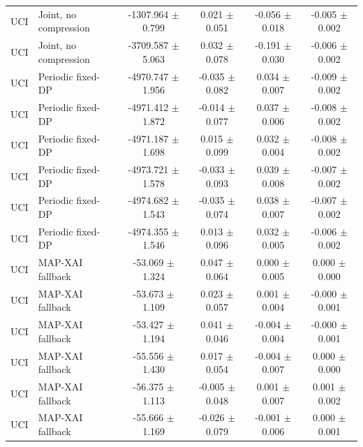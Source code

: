 \begin{tabular}{llcccc}
UCI & Joint, no compression & -1307.964 $\pm$ 0.799 & 0.021 $\pm$ 0.051 & -0.056 $\pm$ 0.018 & -0.005 $\pm$ 0.002 \\
UCI & Joint, no compression & -3709.587 $\pm$ 5.063 & 0.032 $\pm$ 0.078 & -0.191 $\pm$ 0.030 & -0.006 $\pm$ 0.002 \\
UCI & Periodic fixed-DP & -4970.747 $\pm$ 1.956 & -0.035 $\pm$ 0.082 & 0.034 $\pm$ 0.007 & -0.009 $\pm$ 0.002 \\
UCI & Periodic fixed-DP & -4971.412 $\pm$ 1.872 & -0.014 $\pm$ 0.077 & 0.037 $\pm$ 0.006 & -0.008 $\pm$ 0.002 \\
UCI & Periodic fixed-DP & -4971.187 $\pm$ 1.698 & 0.015 $\pm$ 0.099 & 0.032 $\pm$ 0.004 & -0.008 $\pm$ 0.002 \\
UCI & Periodic fixed-DP & -4973.721 $\pm$ 1.578 & -0.033 $\pm$ 0.093 & 0.039 $\pm$ 0.008 & -0.007 $\pm$ 0.002 \\
UCI & Periodic fixed-DP & -4974.682 $\pm$ 1.543 & -0.035 $\pm$ 0.074 & 0.038 $\pm$ 0.007 & -0.007 $\pm$ 0.002 \\
UCI & Periodic fixed-DP & -4974.355 $\pm$ 1.546 & 0.013 $\pm$ 0.096 & 0.032 $\pm$ 0.005 & -0.006 $\pm$ 0.002 \\
UCI & MAP-XAI fallback & -53.069 $\pm$ 1.324 & 0.047 $\pm$ 0.064 & 0.000 $\pm$ 0.005 & 0.000 $\pm$ 0.000 \\
UCI & MAP-XAI fallback & -53.673 $\pm$ 1.109 & 0.023 $\pm$ 0.057 & 0.001 $\pm$ 0.004 & -0.000 $\pm$ 0.001 \\
UCI & MAP-XAI fallback & -53.427 $\pm$ 1.194 & 0.041 $\pm$ 0.046 & -0.004 $\pm$ 0.004 & -0.000 $\pm$ 0.001 \\
UCI & MAP-XAI fallback & -55.556 $\pm$ 1.430 & 0.017 $\pm$ 0.054 & -0.004 $\pm$ 0.007 & 0.000 $\pm$ 0.000 \\
UCI & MAP-XAI fallback & -56.375 $\pm$ 1.113 & -0.005 $\pm$ 0.048 & 0.001 $\pm$ 0.007 & 0.001 $\pm$ 0.002 \\
UCI & MAP-XAI fallback & -55.666 $\pm$ 1.169 & -0.026 $\pm$ 0.079 & -0.001 $\pm$ 0.006 & 0.000 $\pm$ 0.001 \\
\bottomrule
\end{tabular}
